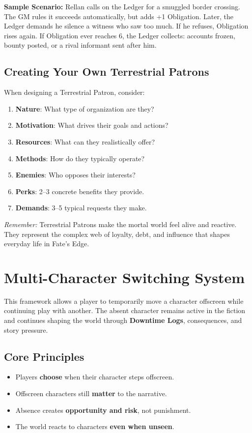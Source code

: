 \textbf{Sample Scenario:} Rellan calls on the Ledger for a smuggled border crossing. The GM rules it succeeds automatically, but adds +1 Obligation. Later, the Ledger demands he silence a witness who saw too much. If he refuses, Obligation rises again. If Obligation ever reaches 6, the Ledger collects: accounts frozen, bounty posted, or a rival informant sent after him.

\subsection{Creating Your Own Terrestrial Patrons}
\label{sec:terrestrial-creating}

When designing a Terrestrial Patron, consider:
\begin{enumerate}
    \item \textbf{Nature}: What type of organization are they?
    \item \textbf{Motivation}: What drives their goals and actions?
    \item \textbf{Resources}: What can they realistically offer?
    \item \textbf{Methods}: How do they typically operate?
    \item \textbf{Enemies}: Who opposes their interests?
    \item \textbf{Perks}: 2–3 concrete benefits they provide.
    \item \textbf{Demands}: 3–5 typical requests they make.
\end{enumerate}

\emph{Remember:} Terrestrial Patrons make the mortal world feel alive and reactive. They represent the complex web of loyalty, debt, and influence that shapes everyday life in Fate’s Edge.

\section{Multi-Character Switching System}
\label{sec:multi-character-switching}

This framework allows a player to temporarily move a character offscreen while continuing play with another. The absent character remains active in the fiction and continues shaping the world through \textbf{Downtime Logs}, consequences, and story pressure.

\subsection{Core Principles}
\label{sec:mcs-principles}
\begin{itemize}
    \item Players \textbf{choose} when their character steps offscreen.
    \item Offscreen characters still \textbf{matter} to the narrative.
    \item Absence creates \textbf{opportunity and risk}, not punishment.
    \item The world reacts to characters \textbf{even when unseen}.
\end{itemize}

